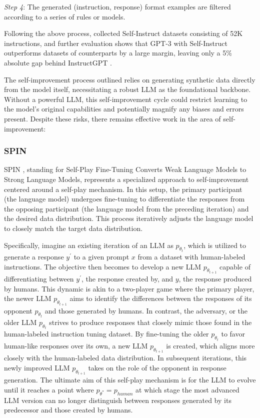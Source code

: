 \documentclass[11pt]{article}
\begin{document}
\textit{Step 4}: The generated (instruction, response) format examples are filtered according to a series of rules or models.

Following the above process, \citet{wang2022self} collected Self-Instruct datasets consisting of 52K instructions, and further evaluation shows that GPT-3 \cite{brown2020language} with Self-Instruct outperforms datasets of counterparts by a large margin, leaving only a 5\% absolute gap behind InstructGPT \citep{ouyang2022training}.

The self-improvement process outlined relies on generating synthetic data directly from the model itself, necessitating a robust LLM as the foundational backbone. Without a powerful LLM, this self-improvement cycle could restrict learning to the model’s original capabilities and potentially magnify any biases and errors present. Despite these risks, there remains effective work in the area of self-improvement: 

\subsubsection{SPIN}

SPIN \cite{chen2024self}, standing for Self-Play Fine-Tuning Converts Weak Language Models to Strong Language Models, represents a specialized approach to self-improvement centered around a self-play mechanism. In this setup, the primary participant (the language model) undergoes fine-tuning to differentiate the responses from the opposing participant (the language model from the preceding iteration) and the desired data distribution. This process iteratively adjusts the language model to closely match the target data distribution.

Specifically, imagine an existing iteration of an LLM as $p_{{\theta}_{t}}$, which is utilized to generate a response $y^{'}$ to a given prompt $x$ from a dataset with human-labeled instructions. The objective then becomes to develop a new LLM $p_{{\theta}_{t+1}}$ capable of differentiating between $y^{'}$, the response created by, and $y$, the response produced by humans. This dynamic is akin to a two-player game where the primary player, the newer LLM $p_{{\theta}_{t+1}}$ aims to identify the differences between the responses of its opponent $p_{{\theta}_{t}}$ and those generated by humans. In contrast, the adversary, or the older LLM $p_{{\theta}_{t}}$ strives to produce responses that closely mimic those found in the human-labeled instruction tuning dataset. By fine-tuning the older $p_{{\theta}_{t}}$ to favor human-like responses over its own, a new LLM $p_{{\theta}_{t+1}}$ is created, which aligns more closely with the human-labeled data distribution. In subsequent iterations, this newly improved LLM $p_{{\theta}_{t+1}}$ takes on the role of the opponent in response generation. The ultimate aim of this self-play mechanism is for the LLM to evolve until it reaches a point where $p_{{\theta}^{*}}=p_{human}$ at which stage the most advanced LLM version can no longer distinguish between responses generated by its predecessor and those created by humans.
\end{document}
